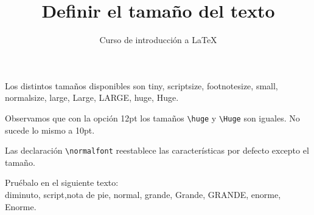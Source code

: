 \documentclass[10pt,letterpaper]{article}
\title{Definir el tamaño del texto}
\author{Curso de introducción a LaTeX}
\begin{document}
\maketitle
Los distintos tamaños disponibles son {\tiny tiny},
{\scriptsize scriptsize},
{\footnotesize footnotesize},
{\small small},
{\normalsize normalsize},
{\large large},
{\Large Large},
{\LARGE LARGE},
{\huge huge}, {\Huge Huge}.

Observamos que con la {\small opción} 12pt los tamaños \texttt{\textbackslash huge} y \texttt{\textbackslash Huge} son iguales. No sucede lo mismo a 10pt.

Las declaración \texttt{\textbackslash normalfont} reestablece las características por defecto excepto el tamaño.

Pruébalo en el siguiente texto:\\
{\tiny diminuto}, {\scriptsize script},{\footnotesize  nota de pie}, {\normalsize normal}, {\large grande}, {\Large Grande}, {\LARGE GRANDE}, {\huge enorme}, {\Huge Enorme}.
\end{document}
